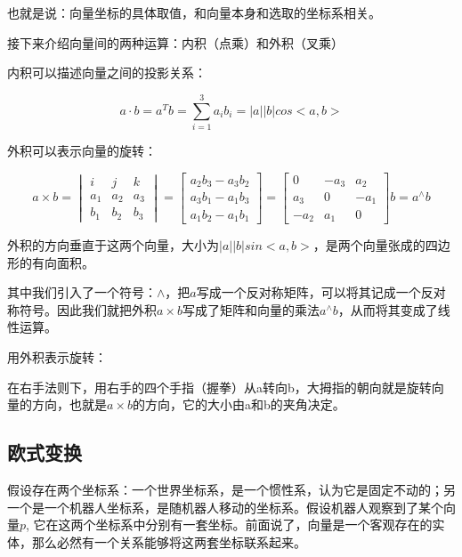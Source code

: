 \documentclass[9pt, oneside]{book}
\begin{document}
也就是说：向量坐标的具体取值，和向量本身和选取的坐标系相关。

接下来介绍向量间的两种运算：内积（点乘）和外积（叉乘）

内积可以描述向量之间的投影关系：

\begin{equation}
    a \cdot b = a^Tb = \sum_{i=1}^3 a_ib_i = |a||b|cos<a,b>
\end{equation}

外积可以表示向量的旋转：

\begin{equation}
    a \times b 
    = 
    \begin{vmatrix}
        i & j & k\\
        a_1 & a_2 & a_3\\
        b_1 & b_2 & b_3
    \end{vmatrix}
    =
    \begin{bmatrix}
        a_2b_3-a_3b_2\\
        a_3b_1-a_1b_3\\
        a_1b_2-a_1b_1
    \end{bmatrix}
    =
    \begin{bmatrix}
        0 & -a_3 & a_2\\
        a_3 & 0 & -a_1\\
        -a_2 & a_1 & 0
    \end{bmatrix}b
    =
    a^{\wedge}b
\end{equation}

外积的方向垂直于这两个向量，大小为$ |a||b|sin<a,b> $，是两个向量张成的四边形的有向面积。

其中我们引入了一个符号：$\wedge$，把$a$写成一个反对称矩阵，可以将其记成一个反对称符号。因此我们就把外积$a\times b$写成了矩阵和向量的乘法$a^{\wedge}b$，从而将其变成了线性运算。

用外积表示旋转：

在右手法则下，用右手的四个手指（握拳）从a转向b，大拇指的朝向就是旋转向量的方向，也就是$a\times b$的方向，它的大小由a和b的夹角决定。

\subsection{欧式变换}

假设存在两个坐标系：一个世界坐标系，是一个惯性系，认为它是固定不动的；另一个是一个机器人坐标系，是随机器人移动的坐标系。假设机器人观察到了某个向量$p$, 它在这两个坐标系中分别有一套坐标。前面说了，向量是一个客观存在的实体，那么必然有一个关系能够将这两套坐标联系起来。
\end{document}
